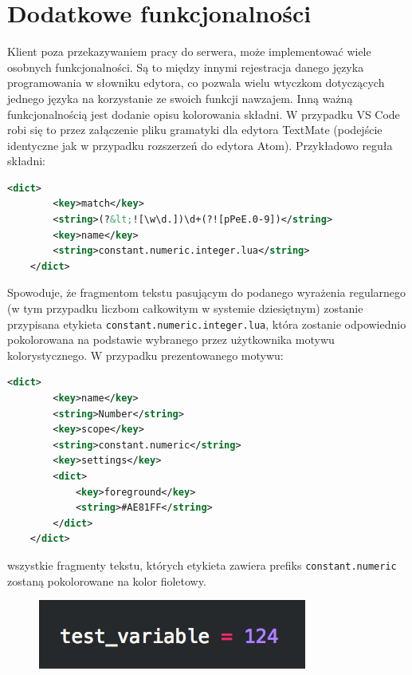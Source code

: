 \section{Dodatkowe funkcjonalności}
Klient poza przekazywaniem pracy do serwera, może implementować wiele osobnych funkcjonalności. Są to między innymi rejestracja danego języka programowania w słowniku edytora, co pozwala wielu wtyczkom dotyczących jednego języka na korzystanie ze swoich funkcji nawzajem. Inną ważną funkcjonalnością jest dodanie opisu kolorowania składni. W przypadku VS Code robi się to przez załączenie pliku gramatyki dla edytora TextMate (podejście identyczne jak w przypadku rozszerzeń do edytora Atom). Przykładowo reguła składni:

\begin{lstlisting}[language=XML, morekeywords={dict,key,string}, basicstyle=\fontsize{9}{10}\ttfamily]
    <dict>
        <key>match</key>
        <string>(?&lt;![\w\d.])\d+(?![pPeE.0-9])</string>
        <key>name</key>
        <string>constant.numeric.integer.lua</string>
    </dict>
\end{lstlisting}

Spowoduje, że fragmentom tekstu pasującym do podanego wyrażenia regularnego (w tym przypadku liczbom całkowitym w systemie dziesiętnym) zostanie przypisana etykieta \texttt{constant.numeric.integer.lua}, która zostanie odpowiednio pokolorowana na podstawie wybranego przez użytkownika motywu kolorystycznego. W przypadku prezentowanego motywu:

\begin{lstlisting}[language=XML, morekeywords={dict,key,string}, basicstyle=\fontsize{9}{10}\ttfamily]
    <dict>
        <key>name</key>
        <string>Number</string>
        <key>scope</key>
        <string>constant.numeric</string>
        <key>settings</key>
        <dict>
            <key>foreground</key>
            <string>#AE81FF</string>
        </dict>
    </dict>
\end{lstlisting}

wszystkie fragmenty tekstu, których etykieta zawiera prefiks \texttt{constant.numeric} zostaną pokolorowane na kolor fioletowy.

\begin{figure}[H]
\centering
\includegraphics{Chapters/kolorowanie_skladni}
\end{figure}
